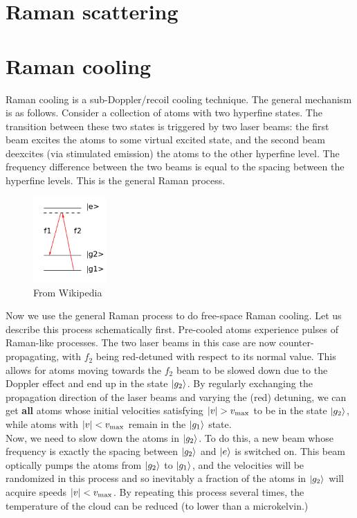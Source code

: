 \documentclass{book}
\theoremstyle{definition}
\begin{document}
\section*{Raman scattering}




\section*{Raman cooling}

Raman cooling is a sub-Doppler/recoil cooling technique. The general mechanism is as follows. Consider a collection of atoms with two hyperfine states. The transition between these two states is triggered by two laser beams: the first beam excites the atoms to some virtual excited state, and the second beam deexcites (via stimulated emission) the atoms to the other hyperfine level. The frequency difference between the two beams is equal to the spacing between the hyperfine levels. This is the general Raman process.


\begin{figure}[!htb]
	\centering
	\includegraphics[width=0.25\textwidth]{images/raman}
	\caption{From Wikipedia}
\end{figure}


Now we use the general Raman process to do free-space Raman cooling. Let us describe this process schematically first. Pre-cooled atoms experience pulses of Raman-like processes. The two laser beams in this case are now counter-propagating, with $f_2$ being red-detuned with respect to its normal value. This allows for atoms moving towards the $f_2$ beam to be slowed down due to the Doppler effect and end up in the state $\ket{g_2}$. By regularly exchanging the propagation direction of the laser beams and varying the (red) detuning, we can get \textbf{all} atoms whose initial velocities satisfying $\abs{v} > v_\text{max}$ to be in the state $\ket{g_2}$, while atoms with $\abs{v} < v_\text{max}$ remain in the $\ket{g_1}$ state. \\

Now, we need to slow down the atoms in $\ket{g_2}$. To do this, a new beam whose frequency is exactly the spacing between $\ket{g_2}$ and $\ket{e}$ is switched on. This beam optically pumps the atoms from $\ket{g_2}$ to $\ket{g_1}$, and the velocities will be randomized in this process and so inevitably a fraction of the atoms in $\ket{g_2}$ will acquire speeds $\abs{v} < v_\text{max}$. By repeating this process several times, the temperature of the cloud can be reduced (to lower than a microkelvin.)\\
\end{document}
